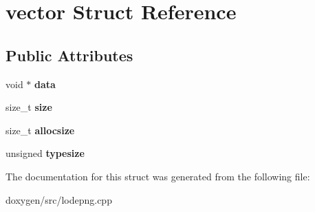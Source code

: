 \hypertarget{structvector}{}\section{vector Struct Reference}
\label{structvector}
\subsection*{Public Attributes}
\begin{DoxyCompactItemize}
\item 
\mbox{\label{structvector_afee87fd86bbabb017991064293317a8b}} 
void $\ast$ {\bfseries data}
\item 
\mbox{\label{structvector_a4200005b6949608d6a533db1a0d299c8}} 
size\+\_\+t {\bfseries size}
\item 
\mbox{\label{structvector_a52795ebc16dc899ccb6c1f9f6238921a}} 
size\+\_\+t {\bfseries allocsize}
\item 
\mbox{\label{structvector_aab0b37e2650659a664f4c993e6309d42}} 
unsigned {\bfseries typesize}
\end{DoxyCompactItemize}


The documentation for this struct was generated from the following file\+:\begin{DoxyCompactItemize}
\item 
doxygen/src/lodepng.\+cpp\end{DoxyCompactItemize}
